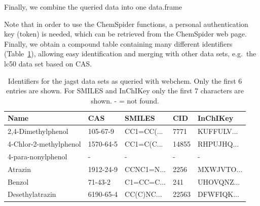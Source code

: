 Finally, we combine the queried data into one data.frame

\begin{knitrout}
\begin{kframe}
\begin{alltt}
 \hlkwb{<-} \hlstd{(}     
                   \hlopt{$}  
                   \hlstd{=} \hlstd{)}
\end{alltt}
\end{kframe}
\end{knitrout}

Note that in order to use the ChemSpider functions, a personal authentication key (token) is needed, which can be retrieved from the ChemSpider web page. 
Finally, we obtain a compound table containing many different identifiers (Table~\ref{tab:comptable}), allowing easy identification and merging with other data sets, e.g.\ the lc50 data set based on CAS.

  \begin{table}[ht]
  \centering
\begin{tabular}{lllll}
  \toprule
Name & CAS & SMILES & CID & InChIKey \\ 
  \midrule
2,4-Dimethylphenol & 105-67-9 & CC1=CC(... & 7771 & KUFFULV... \\ 
  4-Chlor-2-methylphenol & 1570-64-5 & CC1=C(C... & 14855 & RHPUJHQ... \\ 
  4-para-nonylphenol & - & - & - & - \\ 
  Atrazin & 1912-24-9 & CCNC1=N... & 2256 & MXWJVTO... \\ 
  Benzol & 71-43-2 & C1=CC=C... & 241 & UHOVQNZ... \\ 
  Desethylatrazin & 6190-65-4 & CC(C)NC... & 22563 & DFWFIQK... \\ 
   \bottomrule
\end{tabular}

\caption[Identifiers for the jagst data sets as queried with webchem.]{Identifiers for the jagst data sets as queried with webchem. Only the first 6 entries are shown. For SMILES and InChIKey only the first 7 characters are shown. - = not found.}
\label{tab:comptable}
\end{table}


